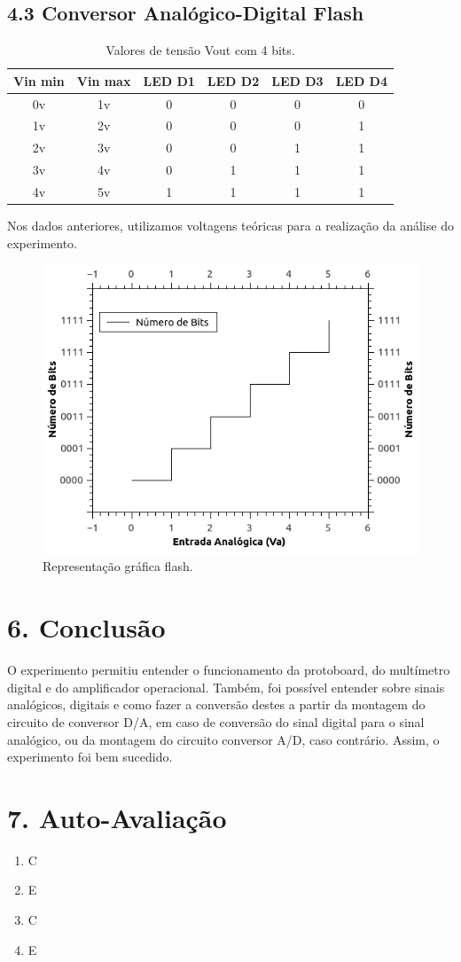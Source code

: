 \documentclass[12pt]{article}
\begin{document}
\subsection{4.3 Conversor Analógico-Digital Flash}
\label{sec:FLASH}


\begin{table}[H]
    \centering
    \caption{Valores de tensão Vout com 4 bits.}
    \begin{tabular}{|c|c|c|c|c|c|}
    \cline{1-6}
    \multicolumn{1}{|c|}{Vin min} & \multicolumn{1}{|c|}{Vin max} & \multicolumn{1}{|c|}{LED D1} & \multicolumn{1}{|c|}{LED D2} & \multicolumn{1}{|c|}{LED D3} & \multicolumn{1}{|c|}{LED D4} \\
    \hline
    0v & 1v & 0 & 0 & 0 & 0\\
    1v & 2v & 0 & 0 & 0 & 1\\
    2v & 3v & 0 & 0 & 1 & 1\\
    3v & 4v & 0 & 1 & 1 & 1\\
    4v & 5v & 1 & 1 & 1 & 1\\
    \hline
    \end{tabular}
    \label{tab:resultadoflash}
\end{table}

Nos dados anteriores, utilizamos voltagens teóricas para a realização da análise do experimento.

\begin{figure}[H]
\centering
\includegraphics[width=.5\textwidth]{graficoconvadflash.jpeg}
\caption{Representação gráfica flash.}
\label{fig:graficoflash}
\end{figure}



\section{6. Conclusão}
\label{sec:Conclusao}

O experimento permitiu entender o funcionamento da protoboard, do multímetro digital e do amplificador operacional. Também, foi possível entender sobre sinais analógicos, digitais e como fazer a conversão destes a partir da montagem do circuito de conversor D/A, em caso de conversão do sinal digital para o sinal analógico, ou da montagem do circuito conversor A/D, caso contrário. Assim, o experimento foi bem sucedido.






\newpage 
\section*{7. Auto-Avaliação}

\begin{enumerate}
    \item C
    \item E
    \item C
    \item E
\end{enumerate}
\end{document}
